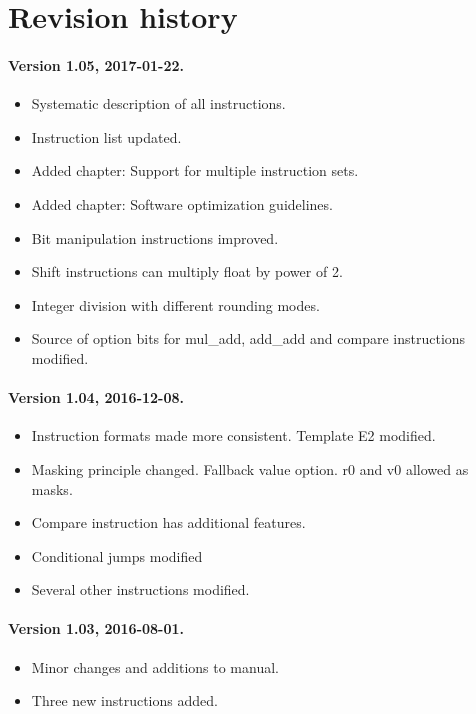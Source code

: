 \documentclass[forwardcom.tex]{subfiles}
\begin{document}
\RaggedRight

\chapter{Revision history}

\subsubsection{Version 1.05, 2017-01-22.}
\begin{itemize}
\item Systematic description of all instructions.
\item Instruction list updated.
\item Added chapter: Support for multiple instruction sets.
\item Added chapter: Software optimization guidelines.
\item Bit manipulation instructions improved.
\item Shift instructions can multiply float by power of 2.
\item Integer division with different rounding modes.
\item Source of option bits for mul\_add, add\_add and compare instructions modified.
\end{itemize}


\subsubsection{Version 1.04, 2016-12-08.}
\begin{itemize}
\item Instruction formats made more consistent. Template E2 modified.
\item Masking principle changed. Fallback value option. r0 and v0 allowed as masks.
\item Compare instruction has additional features.
\item Conditional jumps modified
\item Several other instructions modified.
\end{itemize}


\subsubsection{Version 1.03, 2016-08-01.}
\begin{itemize}
\item Minor changes and additions to manual.
\item Three new instructions added.
\end{itemize}
\end{document}
